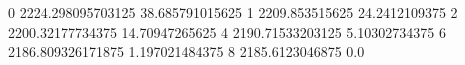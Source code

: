0 2224.298095703125 38.685791015625
1 2209.853515625 24.2412109375
2 2200.32177734375 14.70947265625
4 2190.71533203125 5.10302734375
6 2186.809326171875 1.197021484375
8 2185.6123046875 0.0
